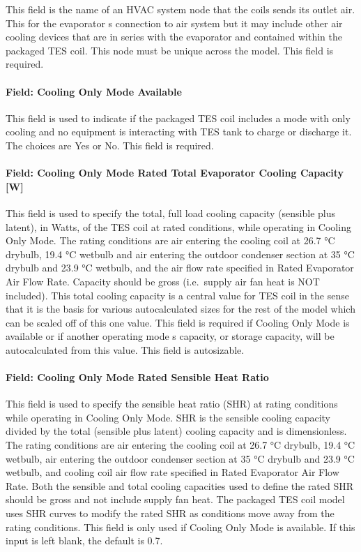This field is the name of an HVAC system node that the coils sends its outlet air. This for the evaporator s connection to air system but it may include other air cooling devices that are in series with the evaporator and contained within the packaged TES coil. This node must be unique across the model. This field is required.

\paragraph{Field: Cooling Only Mode Available}\label{field-cooling-only-mode-available}

This field is used to indicate if the packaged TES coil includes a mode with only cooling and no equipment is interacting with TES tank to charge or discharge it. The choices are Yes or No. This field is required.

\paragraph{Field: Cooling Only Mode Rated Total Evaporator Cooling Capacity {[}W{]}}\label{field-cooling-only-mode-rated-total-evaporator-cooling-capacity-w}

This field is used to specify the total, full load cooling capacity (sensible plus latent), in Watts, of the TES coil at rated conditions, while operating in Cooling Only Mode. The rating conditions are air entering the cooling coil at 26.7 °C drybulb, 19.4 °C wetbulb and air entering the outdoor condenser section at 35 °C drybulb and 23.9 °C wetbulb, and the air flow rate specified in Rated Evaporator Air Flow Rate. Capacity should be gross (i.e.~supply air fan heat is NOT included). This total cooling capacity is a central value for TES coil in the sense that it is the basis for various autocalculated sizes for the rest of the model which can be scaled off of this one value. This field is required if Cooling Only Mode is available or if another operating mode s capacity, or storage capacity, will be autocalculated from this value. This field is autosizable.

\paragraph{Field: Cooling Only Mode Rated Sensible Heat Ratio}\label{field-cooling-only-mode-rated-sensible-heat-ratio}

This field is used to specify the sensible heat ratio (SHR) at rating conditions while operating in Cooling Only Mode. SHR is the sensible cooling capacity divided by the total (sensible plus latent) cooling capacity and is dimensionless. The rating conditions are air entering the cooling coil at 26.7 °C drybulb, 19.4 °C wetbulb, air entering the outdoor condenser section at 35 °C drybulb and 23.9 °C wetbulb, and cooling coil air flow rate specified in Rated Evaporator Air Flow Rate. Both the sensible and total cooling capacities used to define the rated SHR should be gross and not include supply fan heat. The packaged TES coil model uses SHR curves to modify the rated SHR as conditions move away from the rating conditions. This field is only used if Cooling Only Mode is available. If this input is left blank, the default is 0.7.

